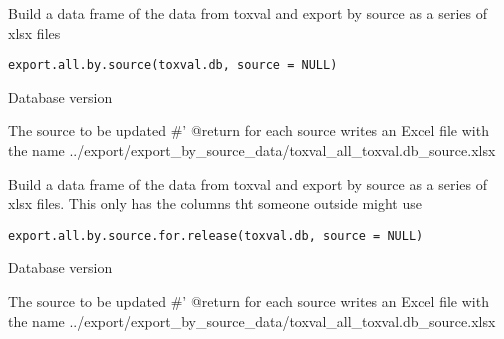 \documentclass[letterpaper]{book}
\begin{document}
%
\begin{Description}\relax
Build a data frame of the data from toxval and export by source as a
series of xlsx files
\end{Description}
%
\begin{Usage}
\begin{verbatim}
export.all.by.source(toxval.db, source = NULL)
\end{verbatim}
\end{Usage}
%
\begin{Arguments}
\begin{ldescription}
\item[\code{toxval.db}] Database version

\item[\code{source}] The source to be updated
\#' @return for each source writes an Excel file with the name
../export/export\_by\_source\_data/toxval\_all\_toxval.db\_source.xlsx
\end{ldescription}
\end{Arguments}
%
\begin{Description}\relax
Build a data frame of the data from toxval and export by source as a
series of xlsx files. This only has the columns tht someone outside might use
\end{Description}
%
\begin{Usage}
\begin{verbatim}
export.all.by.source.for.release(toxval.db, source = NULL)
\end{verbatim}
\end{Usage}
%
\begin{Arguments}
\begin{ldescription}
\item[\code{toxval.db}] Database version

\item[\code{source}] The source to be updated
\#' @return for each source writes an Excel file with the name
../export/export\_by\_source\_data/toxval\_all\_toxval.db\_source.xlsx
\end{ldescription}
\end{Arguments}
\end{document}
